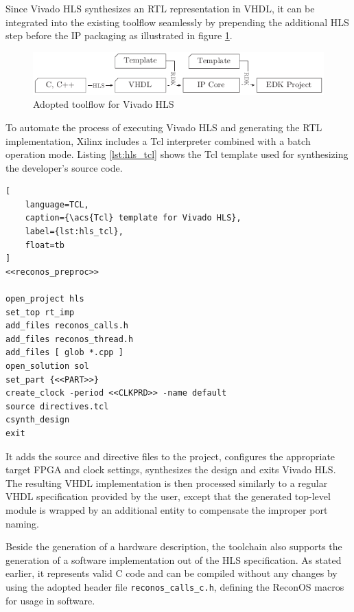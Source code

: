 Since Vivado HLS synthesizes an \ac{RTL} representation in \ac{VHDL}, it can
be integrated into the existing toolflow seamlessly by prepending the
additional \ac{HLS} step before the \ac{IP} packaging as illustrated in figure
\ref{fig:rdk}.
\begin{figure}
	\centering
	\includegraphics{../figures/rdk}
	\caption{Adopted toolflow for Vivado HLS}
	\label{fig:rdk}
\end{figure}
To automate the process of executing Vivado HLS and generating the \ac{RTL}
implementation, Xilinx includes a \ac{Tcl} interpreter combined with a batch
operation mode. Listing \ref{lst:hls_tcl} shows the \ac{Tcl} template used for
synthesizing the developer's source code.
\begin{lstlisting}[
	language=TCL,
	caption={\acs{Tcl} template for Vivado HLS},
	label={lst:hls_tcl},
	float=tb
]
<<reconos_preproc>>

open_project hls
set_top rt_imp
add_files reconos_calls.h
add_files reconos_thread.h
add_files [ glob *.cpp ]
open_solution sol
set_part {<<PART>>}
create_clock -period <<CLKPRD>> -name default
source directives.tcl
csynth_design
exit
\end{lstlisting}
It adds the source and directive files to the project, configures the
appropriate target \ac{FPGA} and clock settings, synthesizes the design and
exits Vivado HLS. The resulting \ac{VHDL} implementation is then processed
similarly to a regular \ac{VHDL} specification provided by the user, except
that the generated top-level module is wrapped by an additional entity to
compensate the improper port naming.

Beside the generation of a hardware description, the toolchain also
supports the generation of a software implementation out of the \ac{HLS}
specification. As stated earlier, it represents valid C code and can be
compiled without any changes by using the adopted header file
\lstinline{reconos_calls_c.h}, defining the ReconOS macros for usage in
software.


